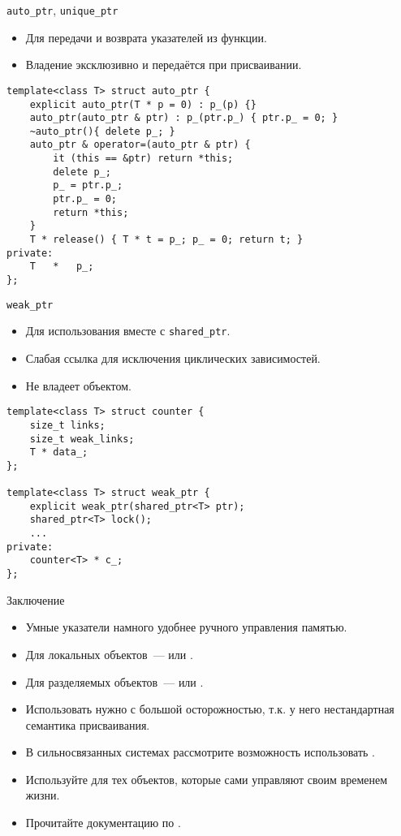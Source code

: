 \documentclass{beamer}
\begin{document}
\begin{frame}[fragile]{\texttt{auto\_ptr}, \texttt{unique\_ptr}}
\small
\begin{itemize}
    \item Для передачи и возврата указателей из функции.
    \item Владение эксклюзивно и передаётся при присваивании.
\end{itemize}
    \begin{lstlisting}
template<class T> struct auto_ptr {
    explicit auto_ptr(T * p = 0) : p_(p) {}
    auto_ptr(auto_ptr & ptr) : p_(ptr.p_) { ptr.p_ = 0; }
    ~auto_ptr(){ delete p_; }
    auto_ptr & operator=(auto_ptr & ptr) {
        it (this == &ptr) return *this;
        delete p_;
        p_ = ptr.p_;
        ptr.p_ = 0;
        return *this;
    }
    T * release() { T * t = p_; p_ = 0; return t; }
private:
    T   *   p_;
};
    \end{lstlisting}
\end{frame}

\begin{frame}[fragile]{\texttt{weak\_ptr}}
\small
\begin{itemize}
    \item Для использования вместе с \texttt{shared\_ptr}.
    \item Слабая ссылка для исключения циклических зависимостей.
    \item Не владеет объектом.
\end{itemize}
    \begin{lstlisting}
template<class T> struct counter {
    size_t links;
    size_t weak_links;
    T * data_;
};

template<class T> struct weak_ptr {
    explicit weak_ptr(shared_ptr<T> ptr);
    shared_ptr<T> lock();
    ...
private:
    counter<T> * c_;
};
    \end{lstlisting}
\end{frame}

\begin{frame}[fragile]{Заключение}
\small
\begin{itemize}
    \item Умные указатели намного удобнее ручного управления памятью.
    \item Для локальных объектов~---  или .
    \item Для разделяемых объектов~---  или .
    \item Использовать  нужно с большой осторожностью, т.к. у
        него нестандартная семантика присваивания.
    \item В сильносвязанных системах рассмотрите возможность использовать
        .
    \item Используйте  для тех объектов, которые
        сами управляют своим временем жизни.
    \item Прочитайте документацию по .
\end{itemize}
\end{frame}
\end{document}
